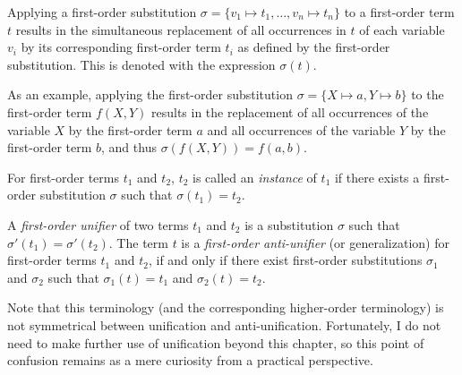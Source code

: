 \begin{defn}\label{def:apply_substitution}
Applying a first-order substitution $\sigma = \{v_1 \mapsto t_1, \ldots, v_n \mapsto t_n\}$ to a first-order term $t$ results in the simultaneous replacement of all occurrences in $t$ of each variable $v_i$ by its corresponding first-order term $t_i$ as defined by the first-order substitution. This is denoted with the expression $\sigma(t)$.
\end{defn}

As an example, applying the first-order substitution $\sigma = \{X \mapsto a, Y \mapsto b\}$
to the first-order term $f(X,Y)$ results in the replacement of all occurrences of the variable $X$ by the first-order term $a$ and all occurrences of the variable $Y$ by the first-order term $b$, and thus $\sigma(f(X,Y)) = f(a,b)$.

\begin{defn}\label{def:instance}
For first-order terms $t_1$ and $t_2$, $t_2$ is called an \emph{instance} of $t_1$ if there exists a first-order substitution $\sigma$ such that $\sigma(t_1) = t_2$.
\end{defn}



\begin{defn}\label{def:generalization}
A \emph{first-order unifier} of two terms $t_1$ and $t_2$ is a substitution $\sigma$ such that $\sigma'(t_1)=\sigma'(t_2)$.  The term $t$ is a \emph{first-order anti-unifier} (or generalization) for first-order terms $t_1$ and $t_2$, if and only if there exist first-order substitutions $\sigma_1$ and $\sigma_2$ such that $\sigma_1(t)=t_1$ and $\sigma_2(t)=t_2$.
\end{defn}

Note that this terminology (and the corresponding higher-order terminology) is not symmetrical between unification and anti-unification.  Fortunately, I do not need to make further use of unification beyond this chapter, so this point of confusion remains as a mere curiosity from a practical perspective.

